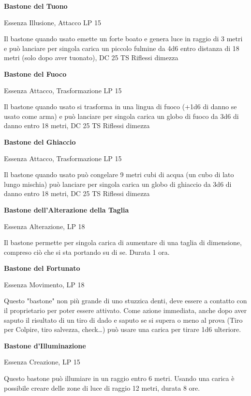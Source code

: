 \documentclass[a4paper,11pt,twoside,openany]{book}
\begin{document}
\bigskip

\textbf{Bastone del Tuono}

Essenza Illusione, Attacco LP 15

Il bastone quando usato emette un forte boato e genera luce in raggio di 3 metri e può lanciare per singola carica un piccolo fulmine da 4d6 entro distanza di 18 metri (solo dopo aver tuonato), DC 25 TS Riflessi dimezza

\textbf{Bastone del Fuoco}

Essenza Attacco, Trasformazione LP 15

Il bastone quando usato si trasforma in una lingua di fuoco (+1d6 di danno se usato come arma) e può lanciare per singola carica un globo di fuoco da 3d6 di danno entro 18 metri, DC 25 TS Riflessi dimezza

\textbf{Bastone del Ghiaccio}

Essenza Attacco, Trasformazione LP 15

Il bastone quando usato può congelare 9 metri cubi di acqua (un cubo di lato lungo mischia) può lanciare per singola carica un globo di ghiaccio da 3d6 di danno entro 18 metri, DC 25 TS Riflessi dimezza

\textbf{Bastone dell'Alterazione della Taglia}

Essenza Alterazione, LP 18

Il bastone permette per singola carica di aumentare di una taglia di dimensione, compreso ciò che si sta portando su di se. Durata 1 ora.

\textbf{Bastone del Fortunato}

Essenza Movimento, LP 18

Questo "bastone" non più grande di uno stuzzica denti, deve essere a contatto con il proprietario per poter essere attivato. Come azione immediata, anche dopo aver saputo il risultato di un tiro di dado e saputo se si supera o meno al prova (Tiro per Colpire, tiro salvezza, check\ldots ) può usare una carica per tirare 1d6 ulteriore.

\textbf{Bastone d'Illuminazione}

Essenza Creazione, LP 15

Questo bastone può illumiare in un raggio entro 6 metri. Usando una carica è possibile creare delle zone di luce di raggio 12 metri, durata 8 ore.
\end{document}

